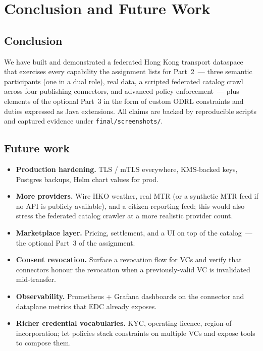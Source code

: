 \documentclass[11pt,a4paper]{article}
\DeclareRobustCommand{\code}[1]{\texttt{\small #1}}
\begin{document}
\section{Conclusion and Future Work}
\label{sec:future}

\subsection{Conclusion}

We have built and demonstrated a federated Hong Kong transport
dataspace that exercises every capability the assignment lists for
Part~2~--- three semantic participants (one in a dual role), real
data, a scripted federated catalog crawl across four publishing
connectors, and advanced policy enforcement~--- plus elements of the
optional Part~3
in the form of custom ODRL constraints and duties expressed as Java
extensions. All claims are backed by reproducible scripts and
captured evidence under \code{final/screenshots/}.

\subsection{Future work}

\begin{itemize}
  \item \textbf{Production hardening.} TLS / mTLS everywhere,
    KMS-backed keys, Postgres backups, Helm chart values for prod.
  \item \textbf{More providers.} Wire HKO weather, real MTR (or a
    synthetic MTR feed if no API is publicly available), and a
    citizen-reporting feed; this would also stress the federated
    catalog crawler at a more realistic provider count.
  \item \textbf{Marketplace layer.} Pricing, settlement, and a UI on
    top of the catalog~--- the optional Part~3 of the assignment.
  \item \textbf{Consent revocation.} Surface a revocation flow for
    VCs and verify that connectors honour the revocation when a
    previously-valid VC is invalidated mid-transfer.
  \item \textbf{Observability.} Prometheus + Grafana dashboards on
    the connector and dataplane metrics that EDC already exposes.
  \item \textbf{Richer credential vocabularies.} KYC,
    operating-licence, region-of-incorporation; let policies stack
    constraints on multiple VCs and expose tools to compose them.
\end{itemize}
\end{document}

